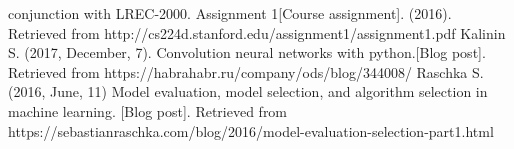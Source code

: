 \begin{thebibliography}
	 conjunction with LREC-2000.
	 {}
	  Assignment 1[Course assignment]. (2016). Retrieved from http://cs224d.stanford.edu/assignment1/assignment1.pdf 
	 {}
		Kalinin S. (2017, December, 7). Convolution neural networks with python.[Blog post]. Retrieved from https://habrahabr.ru/company/ods/blog/344008/
		Raschka S. (2016, June, 11) Model evaluation, model selection, and algorithm selection in machine learning. [Blog post]. Retrieved from
		https://sebastianraschka.com/blog/2016/model-evaluation-selection-part1.html
	 
\end{thebibliography}
